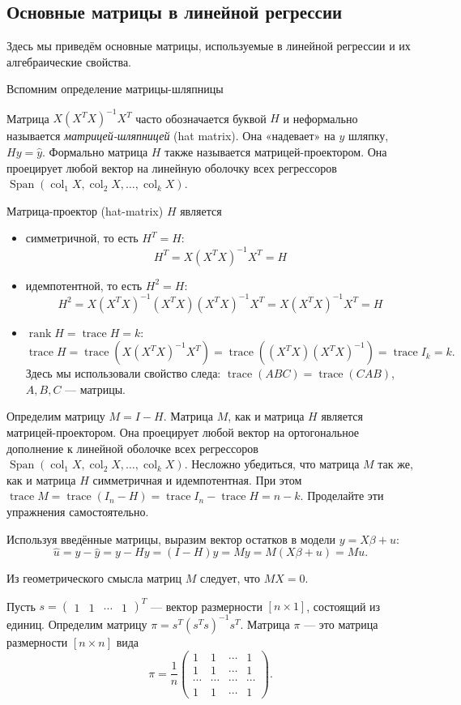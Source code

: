 \documentclass[12pt]{article}
\DeclareMathOperator{\col}{col}
\DeclareMathOperator{\trace}{trace}
\DeclareMathOperator{\rank}{rank}
\DeclareMathOperator{\Span}{Span}
\newcommand{\hu}{\hat{u}}
\newcommand{\hy}{\hat{y}}
\begin{document}


\subsection{Основные матрицы в линейной регрессии}

Здесь мы приведём основные матрицы, используемые в линейной регрессии и их алгебраические свойства. 

Вспомним определение матрицы-шляпницы
\begin{definition}
Матрица $X(X^TX)^{-1} X^T$ часто обозначается буквой $H$ и неформально называется \emph{матрицей-шляпницей} (hat matrix).
Она «надевает» на $y$ шляпку, $Hy = \hat y$.
Формально матрица $H$ также называется матрицей-проектором. 
Она проецирует любой вектор на линейную оболочку всех регрессоров $\Span(\col_1 X, \col_2 X, \dots, \col_k X)$.
\end{definition}

Матрица-проектор (hat-matrix) $H$ является
\begin{itemize}
    \item симметричной, то есть $H^T = H$:
    \[
    H^T = X(X^{T}X)^{-1}X^{T} = H
    \]
    \item идемпотентной, то есть $H^2 = H$:
    \[
    H^2 =  X(X^{T}X)^{-1}(X^{T}X)(X^{T}X)^{-1}X^{T} = X(X^{T}X)^{-1}X^{T} = H
    \]
    \item $\rank H = \trace H = k$:
    \[
    \trace H = \trace (X(X^{T}X)^{-1}X^{T}) = \trace ((X^{T}X)(X^{T}X)^{-1}) = \trace I_k = k.
    \]
    Здесь мы использовали свойство следа: $\trace(ABC) = \trace(CAB)$, $A,B,C$ — матрицы.
\end{itemize}

Определим матрицу $M = I-H$. Матрица $M$, как и матрица $H$ является матрицей-проектором. Она проецирует любой вектор на ортогональное дополнение к линейной оболочке всех регрессоров $\Span(\col_1 X, \col_2 X, \dots, \col_k X)$. Несложно убедиться, что матрица $M$ так же, как и матрица $H$ симметричная и идемпотентная. При этом $\trace M = \trace(I_n - H) = \trace I_n - \trace H = n - k$. Проделайте эти упражнения самостоятельно.


Используя введённые матрицы, выразим вектор остатков в модели $y = X\beta + u$:
\[
\hu = y - \hy = y - Hy = (I - H)y = My = M(X\beta + u) = Mu.
\]

Из геометрического смысла матриц $M$ следует, что $MX = 0$.

Пусть 
$s = 
 \begin{pmatrix}
  1 & 1 & \cdots & 1
 \end{pmatrix}^{T}$  — вектор размерности $[n \times 1]$, состоящий из единиц.
Определим матрицу $\pi = s^{T}(s^{T}s)^{-1}s^{T}$. Матрица $\pi$ — это матрица размерности $[n \times n]$ вида
\[
\pi = \frac{1}{n}
 \begin{pmatrix}
  1 & 1 & \cdots & 1\\
  1 & 1 & \cdots & 1\\
  \cdots & \cdots & \cdots & \cdots \\
  1 & 1 & \cdots & 1
 \end{pmatrix}.
 \]
 
\end{document}
